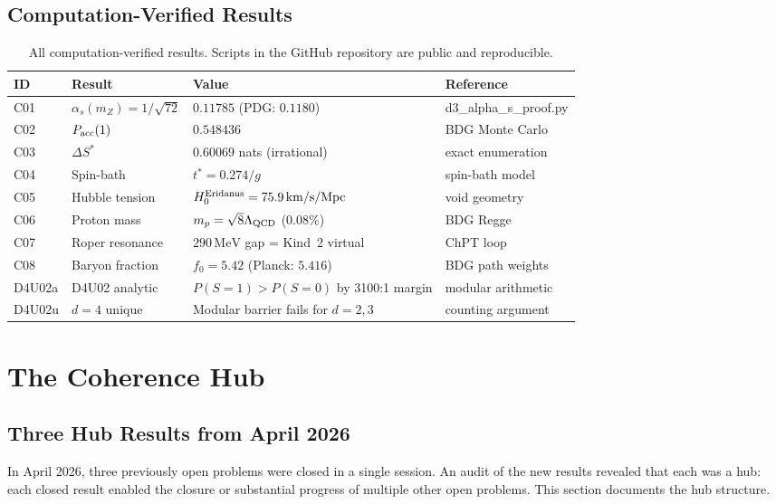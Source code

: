\documentclass[12pt,a4paper]{article}
\begin{document}
\subsection{Computation-Verified Results}

\begin{table}[ht]
\centering
\caption{All computation-verified results.  Scripts in the GitHub repository are public and reproducible.}
\label{tab:cv}
\begin{tabular}{llll}
\toprule
ID & Result & Value & Reference \\
\midrule
C01 & $\alpha_s(m_Z)=1/\sqrt{72}$ & $0.11785$ (PDG: $0.1180$) & d3\_alpha\_s\_proof.py \\
C02 & $P_{\rm acc}(1)$ & $0.548436$ & BDG Monte Carlo \\
C03 & $\Delta S^*$ & $0.60069$ nats (irrational) & exact enumeration \\
C04 & Spin-bath & $t^*=0.274/g$ & spin-bath model \\
C05 & Hubble tension & $H_0^{\rm Eridanus}=75.9\,\mathrm{km/s/Mpc}$ & void geometry \\
C06 & Proton mass & $m_p=\sqrt{8}\Lambda_{\rm QCD}$ (0.08\%) & BDG Regge \\
C07 & Roper resonance & $290\,\mathrm{MeV}$ gap = Kind~2 virtual & ChPT loop \\
C08 & Baryon fraction & $f_0=5.42$ (Planck: $5.416$) & BDG path weights \\
D4U02a & D4U02 analytic & $P(S=1)>P(S=0)$ by 3100:1 margin & modular arithmetic \\
D4U02u & $d=4$ unique & Modular barrier fails for $d=2,3$ & counting argument \\
\bottomrule
\end{tabular}
\end{table}

\section{The Coherence Hub}\label{sec:hub}

\subsection{Three Hub Results from April 2026}

In April 2026, three previously open problems were closed in a single session.  An audit of the new results revealed that each was a hub: each closed result enabled the closure or substantial progress of multiple other open problems.  This section documents the hub structure.
\end{document}
